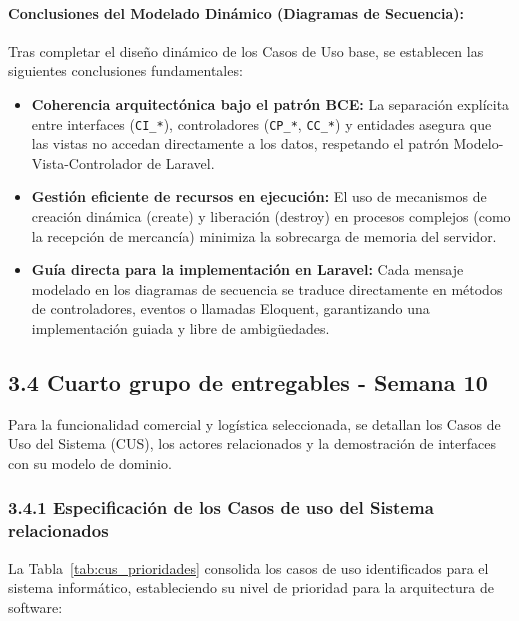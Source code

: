 \documentclass[12pt,a4paper]{article}
\begin{document}
\paragraph{Conclusiones del Modelado Din\'amico (Diagramas de Secuencia):}
Tras completar el dise\~no din\'amico de los Casos de Uso base, se establecen las siguientes conclusiones fundamentales:
\begin{itemize}
    \item \textbf{Coherencia arquitect\'onica bajo el patr\'on BCE:} La separaci\'on expl\'icita entre interfaces (\texttt{CI\_*}), controladores (\texttt{CP\_*}, \texttt{CC\_*}) y entidades asegura que las vistas no accedan directamente a los datos, respetando el patr\'on Modelo-Vista-Controlador de Laravel.
    \item \textbf{Gesti\'on eficiente de recursos en ejecuci\'on:} El uso de mecanismos de creaci\'on din\'amica (\guillemotleft create\guillemotright) y liberaci\'on (\guillemotleft destroy\guillemotright) en procesos complejos (como la recepci\'on de mercanc\'ia) minimiza la sobrecarga de memoria del servidor.
    \item \textbf{Gu\'ia directa para la implementaci\'on en Laravel:} Cada mensaje modelado en los diagramas de secuencia se traduce directamente en m\'etodos de controladores, eventos o llamadas Eloquent, garantizando una implementaci\'on guiada y libre de ambig\"uedades.
\end{itemize}

\subsection{3.4 Cuarto grupo de entregables - Semana 10}

Para la funcionalidad comercial y logística seleccionada, se detallan los Casos de Uso del Sistema (CUS), los actores relacionados y la demostración de interfaces con su modelo de dominio.

\subsubsection{3.4.1 Especificaci\'on de los Casos de uso del Sistema relacionados}

La Tabla~\ref{tab:cus_prioridades} consolida los casos de uso identificados para el sistema informático, estableciendo su nivel de prioridad para la arquitectura de software:



\clearpage
\end{document}
